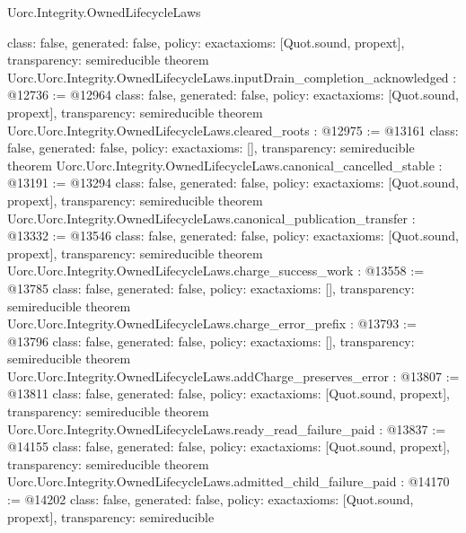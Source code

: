 \begin{lexlean}{Uorc.Integrity.OwnedLifecycleLaws}
\begin{coremodule}
{  class: false,
  generated: false,
  policy: exact{axioms: [Quot.sound, propext]},
  transparency: semireducible
}
theorem Uorc.Uorc.Integrity.OwnedLifecycleLaws.inputDrain_completion_acknowledged : @12736 := @12964 {
  class: false,
  generated: false,
  policy: exact{axioms: [Quot.sound, propext]},
  transparency: semireducible
}
theorem Uorc.Uorc.Integrity.OwnedLifecycleLaws.cleared_roots : @12975 := @13161 {
  class: false,
  generated: false,
  policy: exact{axioms: []},
  transparency: semireducible
}
theorem Uorc.Uorc.Integrity.OwnedLifecycleLaws.canonical_cancelled_stable : @13191 := @13294 {
  class: false,
  generated: false,
  policy: exact{axioms: [Quot.sound, propext]},
  transparency: semireducible
}
theorem Uorc.Uorc.Integrity.OwnedLifecycleLaws.canonical_publication_transfer : @13332 := @13546 {
  class: false,
  generated: false,
  policy: exact{axioms: [Quot.sound, propext]},
  transparency: semireducible
}
theorem Uorc.Uorc.Integrity.OwnedLifecycleLaws.charge_success_work : @13558 := @13785 {
  class: false,
  generated: false,
  policy: exact{axioms: []},
  transparency: semireducible
}
theorem Uorc.Uorc.Integrity.OwnedLifecycleLaws.charge_error_prefix : @13793 := @13796 {
  class: false,
  generated: false,
  policy: exact{axioms: []},
  transparency: semireducible
}
theorem Uorc.Uorc.Integrity.OwnedLifecycleLaws.addCharge_preserves_error : @13807 := @13811 {
  class: false,
  generated: false,
  policy: exact{axioms: [Quot.sound, propext]},
  transparency: semireducible
}
theorem Uorc.Uorc.Integrity.OwnedLifecycleLaws.ready_read_failure_paid : @13837 := @14155 {
  class: false,
  generated: false,
  policy: exact{axioms: [Quot.sound, propext]},
  transparency: semireducible
}
theorem Uorc.Uorc.Integrity.OwnedLifecycleLaws.admitted_child_failure_paid : @14170 := @14202 {
  class: false,
  generated: false,
  policy: exact{axioms: [Quot.sound, propext]},
  transparency: semireducible
}


\end{coremodule}
\end{lexlean}
